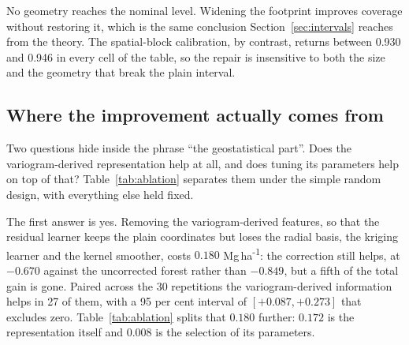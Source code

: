 \documentclass[preprint,12pt,authoryear]{elsarticle}
\newcommand{\Mgha}{Mg\,ha\textsuperscript{-1}}
\begin{document}
No geometry reaches the nominal level. Widening the footprint improves coverage
without restoring it, which is the same conclusion Section~\ref{sec:intervals}
reaches from the theory. The spatial-block calibration, by contrast, returns
between 0.930 and 0.946 in every cell of the table, so the repair is insensitive
to both the size and the geometry that break the plain interval.

\begin{table}[!ht]
\centering
\caption{Sample-size and geometry sensitivity, 30 repetitions per cell, nominal
0.90, validation draw of 500 throughout. Units $\times$ pts gives the primary
units and the points drawn within each, with the realised expected number of
distinct units in parentheses, primary units being drawn with replacement. Gap
is the design-based RMSE divided by the out-of-fold RMSE of the calibration
sample, so it measures how much larger the error over the domain is than the
error the conformal quantile was built from. RMSE is in \Mgha{}; PICP, SD and
the confidence interval describe the CV+ interval, with leading zeros dropped on
the bounded columns; Block is the spatial-block calibration.
\textsuperscript{a}\,The 20 $\times$ 25 campaign is the design shared by both clustered arms
and is one set of 30 repetitions reported twice, so the arms meet at it rather
than crossing.}
\label{tab:sizes}
\footnotesize
\setlength{\tabcolsep}{2pt}

\end{table}

\subsection{Where the improvement actually comes from}
\label{sec:ablation}

Two questions hide inside the phrase ``the geostatistical part''. Does the
variogram-derived representation help at all, and does tuning its parameters
help on top of that? Table~\ref{tab:ablation} separates them under the simple
random design, with everything else held fixed.

The first answer is yes. Removing the variogram-derived features, so that the
residual learner keeps the plain coordinates but loses the radial basis, the
kriging learner and the kernel smoother, costs $0.180$ \Mgha{}: the correction
still helps, at $-0.670$ against the uncorrected forest rather than $-0.849$,
but a fifth of the total gain is gone. Paired across the 30 repetitions the
variogram-derived information helps in 27 of them, with a 95 per cent interval
of $[+0.087, +0.273]$ that excludes zero. Table~\ref{tab:ablation} splits that
$0.180$ further: $0.172$ is the representation itself and $0.008$ is the
selection of its parameters.
\end{document}
